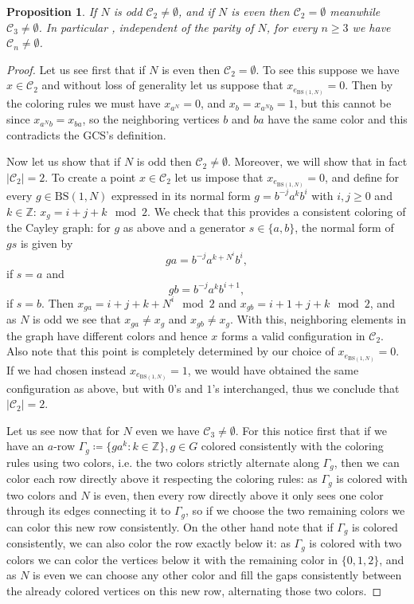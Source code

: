 \documentclass{aims}
\newcommand{\BS}[1][N]{\mathrm{BS}(1,#1)}
\newtheorem{proposition}{Proposition}
\theoremstyle{definition}
\begin{document}
\begin{proposition}\label{prop:GCS_nonemptiness} If $N$ is odd $\mathcal{C}_2\neq \emptyset$, and if $N$ is even then $\mathcal{C}_2=\emptyset$ meanwhile $\mathcal{C}_3\neq \emptyset$. In particular , independent of the parity of $N$, for every $n\ge 3$ we have $\mathcal{C}_n\neq \emptyset$.
\end{proposition}
\begin{proof}
	Let us see first that if $N$ is even then $\mathcal{C}_2=\emptyset$. To see this suppose we have $x\in \mathcal{C}_2$ and without loss of generality let us suppose that $x_{e_{\BS}}=0$. Then by the coloring rules we must have $x_{a^{N}}=0$, and $x_{b}=x_{a^Nb}=1$, but this cannot be since $x_{a^Nb}=x_{ba}$, so the neighboring vertices $b$ and $ba$ have the same color and this contradicts the GCS's definition.
	
	
	Now let us show that if $N$ is odd then $\mathcal{C}_2\neq \emptyset$. Moreover, we will show that in fact $|\mathcal{C}_2|=2$. To create a point $x\in \mathcal{C}_2$ let us impose that $x_{e_{\BS}}=0$, and define for every $g\in \BS$ expressed in its normal form $g=b^{-j}a^kb^i$ with $i,j\ge 0$ and $k\in \mathbb{Z}$: $x_g=i+j+k \mod 2$. We check that this provides a consistent coloring of the Cayley graph:
	for $g$ as above and a generator $s\in \{a,b\}$, the normal form of $gs$ is given by
	$$
	ga=b^{-j}a^{k+N^i}b^{i},
	$$
	if $s=a$ and 
	$$
	gb=b^{-j}a^{k}b^{i+1},
	$$
	if $s=b$.
	Then $x_{ga}=i+j+k+N^i \mod 2$ and $x_{gb}=i+1+j+k \mod 2$, and as $N$ is odd we see that $x_{ga}\neq x_g$ and $x_{gb}\neq x_g$. With this, neighboring elements in the graph have different colors and hence $x$ forms a valid configuration in $\mathcal{C}_2$. Also note that this point is completely determined by our choice of $x_{e_{\BS}}=0.$ If we had chosen instead $x_{e_{\BS}}=1$, we would have obtained the same configuration as above, but with $0$'s and $1$'s interchanged, thus we conclude that $|\mathcal{C}_2|=2$.
	
	
	Let us see now that for $N$ even we have $\mathcal{C}_3\neq\emptyset$. For this notice first that if we have an $a$-row $\Gamma_g\coloneqq\{ga^k: k\in \mathbb{Z}\}, g\in G$ colored consistently with the coloring rules using two colors, i.e. the two colors strictly alternate along $\Gamma_g$, then we can color each row directly above it respecting the coloring rules: as $\Gamma_g$ is colored with two colors and $N$ is even, then every row directly above it only sees one color through its edges connecting it to $\Gamma_g$, so if we choose the two remaining colors we can color this new row consistently. On the other hand note that if $\Gamma_g$ is colored consistently, we can also color the row exactly below it: as $\Gamma_g$ is colored with two colors we can color the vertices below it with the remaining color in $\{0,1,2\}$, and as $N$ is even we can choose any other color and fill the gaps consistently between the already colored vertices on this new row, alternating those two colors.
	

\end{proof}
\end{document}
